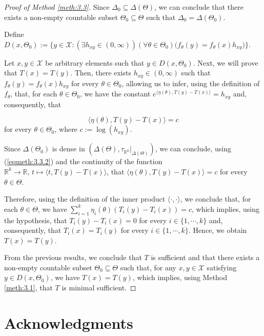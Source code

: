 \documentclass[12pt]{article}
\begin{document}
\begin{proof}[Proof of Method \ref{meth:3.3}]
Since $\Delta _0\subseteq\Delta (\Theta )$, we can conclude that there exists a non-empty countable subset $\Theta _0\subseteq\Theta$ such that $\Delta _0=\Delta (\Theta _0)$.

Define $D(x,\Theta _0):=\big\{y\in \mathcal{X}:(\exists h_{xy}\in (0,\infty ))(\forall \theta \in \Theta _0)\big(f_\theta (y)=f_\theta (x)h_{xy}\big)\big\}$.

Let $x,y\in\mathcal{X}$ be arbitrary elements such that $y\in D(x,\Theta _0)$. Next, we will prove that $T(x)=T(y)$. Then, there exists $h_{xy}\in (0,\infty )$ such that $f_\theta (y)=f_\theta (x)h_{xy}$ for every $\theta\in\Theta_0$, allowing us to infer, using the definition of $f_\theta$, that, for each $\theta\in\Theta _0$, we have the constant $e^{\langle \eta (\theta ),T(y)-T(x)\rangle }=h_{xy}$ and, consequently, that 

\begin{equation}
\label{eqmeth:3.3.2}
\langle \eta (\theta ),T(y)-T(x)\rangle =c
\end{equation} for every $\theta\in \Theta _0$, where $c:=\log (h_{xy})$.

Since $\Delta (\Theta _0)$ is dense in $(\Delta (\Theta ),\tau _{\mathbb{R}^k}|_{\Delta (\Theta )})$, we can conclude, using (\ref{eqmeth:3.3.2}) and the continuity of the function $\mathbb{R}^k\to \mathbb{R},\,t\mapsto \langle t,T(y)-T(x)\rangle $, that $\langle \eta (\theta ),T(y)-T(x)\rangle =c$ for every $\theta\in\Theta$.

Therefore, using the definition of the inner product $\langle \cdot ,\cdot \rangle $, we conclude that, for each $\theta\in\Theta$, we have $\sum _{i=1}^k\eta _i(\theta )(T_i(y)-T_i(x))=c$, which implies, using the hypothesis, that $T_i(y)-T_i(x)=0$ for every $i\in \{1,\cdots,k\}$ and, consequently, that $T_i(x)=T_i(y)$ for every $i\in \{1,\cdots, k\}$. Hence, we obtain $T(x)=T(y)$.

From the previous results, we conclude that $T$ is sufficient and that there exists a non-empty countable subset $\Theta_0\subseteq\Theta$ such that, for any $x,y\in\mathcal{X}$ satisfying $y\in D(x,\Theta _0)$, we have $T(x)=T(y)$, which implies, using Method \ref{meth:3.1}, that $T$ is minimal sufficient.




\end{proof}

\section{Acknowledgments}
\end{document}
